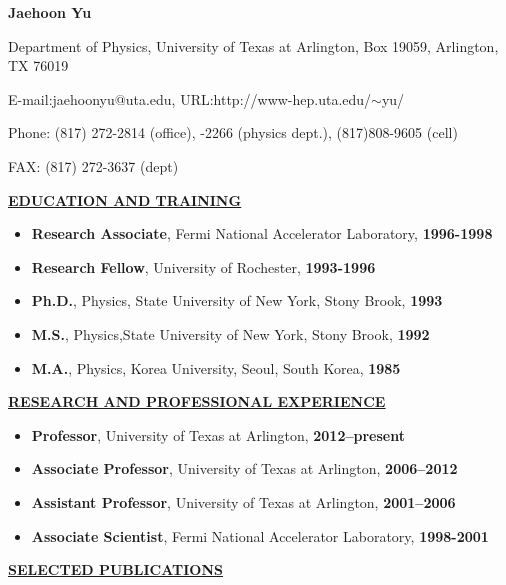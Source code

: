 \begin{center}

{\bf Jaehoon Yu}

Department of Physics, University of Texas at Arlington, Box 19059, Arlington, TX 76019

E-mail:jaehoonyu@uta.edu, URL:http://www-hep.uta.edu/$\sim$yu/

Phone: (817) 272-2814 (office), -2266 (physics dept.), (817)808-9605 (cell)

FAX: (817) 272-3637 (dept)

\end{center}
%
{\underline{\underline{{\bf EDUCATION AND TRAINING}}}}
\begin{itemize}[noitemsep]
\item {\bf Research Associate}{, Fermi National Accelerator Laboratory,} {\bf 1996-1998}
\item {\bf Research Fellow}{, University of Rochester,} {\bf 1993-1996}
\item {\bf Ph.D.}{, Physics, State University of New York, Stony Brook, } {\bf 1993}
\item {\bf M.S.}{, Physics,State University of New York, Stony Brook, } {\bf 1992}
\item {\bf M.A.}{, Physics, Korea University, Seoul, South Korea,} {\bf 1985}
\end{itemize}
%
{\underline{\underline{{\bf RESEARCH AND PROFESSIONAL EXPERIENCE}}}}
\begin{itemize}[noitemsep]
\item {\bf Professor}{, University of Texas at Arlington, } {\bf 2012--present}
\item {\bf Associate Professor}{, University of Texas at Arlington, } {\bf 2006--2012}
\item {\bf Assistant Professor}{, University of Texas at Arlington, } {\bf 2001--2006}
\item {\bf Associate Scientist}{, Fermi National Accelerator Laboratory, }{\bf 1998-2001}
\end{itemize}
%
{\underline{\underline{{\bf SELECTED PUBLICATIONS}}}}
